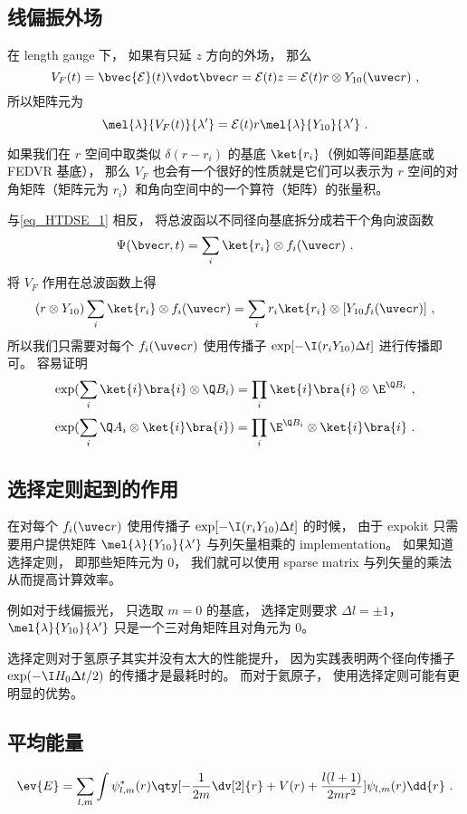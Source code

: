\subsection{线偏振外场}
在 length gauge 下， 如果有只延 $z$ 方向的外场， 那么
\begin{equation}
V_F(t) = \bvec{\mathcal E}(t) \vdot \bvec r =  \mathcal E(t) z = \mathcal E(t) r \otimes Y_{10}(\uvec r)~,
\end{equation}
所以矩阵元为
\begin{equation}
\mel{\lambda}{V_F(t)}{\lambda'} =  \mathcal E(t) r \mel{\lambda}{Y_{10}}{\lambda'}~.
\end{equation}

如果我们在 $r$ 空间中取类似 $\delta(r - r_i)$ 的基底 $\ket{r_i}$（例如等间距基底或 FEDVR 基底）， 那么 $V_F$ 也会有一个很好的性质就是它们可以表示为 $r$ 空间的对角矩阵（矩阵元为 $r_i$）和角向空间中的一个算符（矩阵）的张量积。 

与\autoref{eq_HTDSE_1} 相反， 将总波函以不同径向基底拆分成若干个角向波函数
\begin{equation}
\Psi(\bvec r, t) = \sum_i \ket{r_i} \otimes f_i(\uvec r)~.
\end{equation}
将 $V_F$ 作用在总波函数上得
\begin{equation}
(r \otimes Y_{10})\sum_i \ket{r_i} \otimes f_i(\uvec r)
= \sum_i r_i\ket{r_i} \otimes [Y_{10} f_i(\uvec r)]~,
\end{equation}
所以我们只需要对每个 $f_i(\uvec r)$ 使用传播子 $\exp[-\I (r_i Y_{10}) \Delta t]$ 进行传播即可。 容易证明%
\begin{equation}
\exp(\sum_i \ket{i}\bra{i} \otimes \Q B_i) = \prod_i \ket{i}\bra{i} \otimes  \E^{\Q B_i}~,
\end{equation}
\begin{equation}
\exp(\sum_i  \Q A_i \otimes \ket{i}\bra{i}) = \prod_i  \E^{\Q B_i} \otimes \ket{i}\bra{i}~.
\end{equation}

\subsection{选择定则起到的作用}
在对每个 $f_i(\uvec r)$ 使用传播子 $\exp[-\I (r_i Y_{10}) \Delta t]$ 的时候， 由于 expokit 只需要用户提供矩阵 $\mel{\lambda}{Y_{10}}{\lambda'}$ 与列矢量相乘的 implementation。 如果知道选择定则， 即那些矩阵元为 0， 我们就可以使用 sparse matrix 与列矢量的乘法从而提高计算效率。

例如对于线偏振光， 只选取 $m = 0$ 的基底， 选择定则要求 $\Delta l = \pm 1$， $\mel{\lambda}{Y_{10}}{\lambda'}$ 只是一个三对角矩阵且对角元为 0。

选择定则对于氢原子其实并没有太大的性能提升， 因为实践表明两个径向传播子 $\exp(-\I H_0 \Delta t/2)$ 的传播才是最耗时的。 而对于氦原子， 使用选择定则可能有更明显的优势。


\subsection{平均能量}
\begin{equation}
\ev{E} = \sum_{l,m} \int \psi^*_{l,m}(r) \qty[-\frac{1}{2m}\dv[2]{r} + V(r) + \frac{l(l+1)}{2mr^2}] \psi_{l,m}(r) \dd{r}~.
\end{equation}
